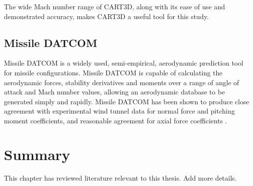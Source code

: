 The wide Mach number range of CART3D, along with its ease of use and demonstrated accuracy, makes CART3D a useful tool for this study. 

\subsection{Missile DATCOM}
Missile DATCOM is a widely used, semi-empirical, aerodynamic prediction tool for missile configurations. Missile DATCOM is capable of calculating the aerodynamic forces, stability derivatives and moments over a range of angle of attack and Mach number values, allowing an aerodynamic database to be generated simply and rapidly. Missile DATCOM has been shown to produce close agreement with experimental wind tunnel data for normal force and pitching moment coefficients, and reasonable agreement for axial force coefficients \cite{Sooy2005}. 

  \section{Summary}\label{chapter2:summary}

      This chapter has reviewed literature relevant to this thesis. Add more details.